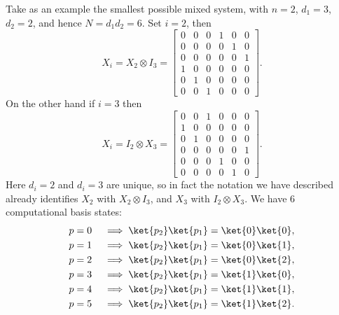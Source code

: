 Take as an example the smallest possible mixed system, with $n = 2$, $d_1 = 3$, $d_2 = 2$, and hence $N = d_1d_2 = 6$. Set $i = 2$, then
\[X_i = X_2 \otimes I_3 = \begin{bmatrix}
0 & 0 & 0 & 1 & 0 & 0 \\
0 & 0 & 0 & 0 & 1 & 0 \\
0 & 0 & 0 & 0 & 0 & 1 \\
1 & 0 & 0 & 0 & 0 & 0 \\
0 & 1 & 0 & 0 & 0 & 0 \\
0 & 0 & 1 & 0 & 0 & 0
\end{bmatrix}.\]
On the other hand if $i = 3$ then
\[X_i = I_2 \otimes X_3 = \begin{bmatrix}
	0 & 0 & 1 & 0 & 0 & 0 \\
	1 & 0 & 0 & 0 & 0 & 0 \\
	0 & 1 & 0 & 0 & 0 & 0 \\
	0 & 0 & 0 & 0 & 0 & 1 \\
	0 & 0 & 0 & 1 & 0 & 0 \\
	0 & 0 & 0 & 0 & 1 & 0
\end{bmatrix}.\]
Here $d_i = 2$ and $d_i = 3$ are unique, so in fact the notation we have described already identifies $X_2$ with $X_2 \otimes I_3$, and $X_3$ with $I_2 \otimes X_3$. We have 6 computational basis states:
\begin{align*}
	p = 0 &&& \implies \ket{p_2}\ket{p_1} = \ket{0}\ket{0}, \\
	p = 1 &&& \implies \ket{p_2}\ket{p_1} = \ket{0}\ket{1}, \\
	p = 2 &&& \implies \ket{p_2}\ket{p_1} = \ket{0}\ket{2}, \\
	p = 3 &&& \implies \ket{p_2}\ket{p_1} = \ket{1}\ket{0}, \\
	p = 4 &&& \implies \ket{p_2}\ket{p_1} = \ket{1}\ket{1}, \\
	p = 5 &&& \implies \ket{p_2}\ket{p_1} = \ket{1}\ket{2}.
\end{align*}

